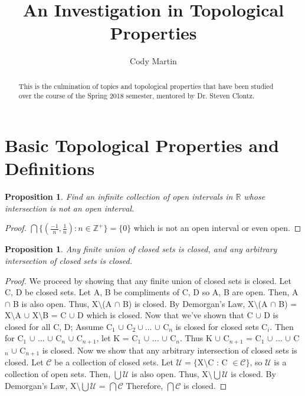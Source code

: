 \documentclass{amsart}
\theoremstyle{plain}
\newtheorem{proposition}[theorem]{Proposition}
\theoremstyle{definition}
\theoremstyle{remark}
\begin{document}
\title{An Investigation in Topological Properties}


\author{Cody Martin}
\address{1313 Schillinger Rd. S. 
Apt. 3407
Mobile, AL 36695}









\begin{abstract}
  This is the culmination of topics and topological properties that have been studied over the course of the Spring 2018 semester, mentored by Dr. Steven Clontz.
\end{abstract}


\maketitle

\section{Basic Topological Properties and Definitions}


	\begin{proposition}
	Find an infinite collection of open intervals in $\mathbb{R}$ whose intersection is not an open interval.
	\end{proposition}
	\begin{proof}
	$\bigcap\lbrace (\frac{-1}{n}, \frac{1}{n}) : n \in \mathbb{Z}^+\rbrace = \lbrace 0 \rbrace$ which is not an open interval or even open.
	\end{proof}

  \begin{proposition}
      Any finite union of closed sets is closed, and any arbitrary intersection of closed sets is closed.
  \end{proposition}
  \begin{proof}
	We proceed by showing that any finite union of closed sets is closed. Let C, D be closed sets. Let A, B be compliments of C, D so A, B are open. Then, A $\cap$ B is also open. Thus, X$\setminus$(A $\cap$ B) is closed. By Demorgan's Law, X$\setminus$(A $\cap$ B) = X$\setminus$A $\cup$ X$\setminus$B = C $\cup$ D which is closed.
	\newline\newline Now that we've shown that C $\cup$ D is closed for all C, D; Assume C$_1$ $\cup $ C$_2 \cup ...$ $\cup $ C$_n$ is closed for closed sets C$_i$. Then for C$_1$ $\cup$ ... $\cup$ C$_n$ $\cup$ C$_{n+1}$, let K = C$_1$ $\cup$ ... $\cup$ C$_n$. Thus K $\cup$ C$_{n+1}$ = C$_1$ $\cup$ ... $\cup$ C$_n$ $\cup$ C$_{n+1}$ is closed.
	\newline\newline Now we show that any arbitrary intersection of closed sets is closed. Let $\mathcal{C}$ be a collection of closed sets. Let $\mathcal{U} = \lbrace$X$\setminus$C : C $\in \mathcal{C}\rbrace$, so $\mathcal{U}$ is a collection of open sets. Then, $\bigcup \mathcal{U}$ is also open. Thus, X$\setminus\bigcup\mathcal{U}$ is closed. By Demorgan's Law, X$\setminus\bigcup\mathcal{U}$ = $\bigcap\mathcal{C}$ Therefore, $\bigcap\mathcal{C}$ is closed.
	\end{proof}
\end{document}
